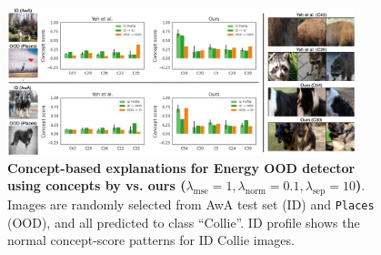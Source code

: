 \begin{figure}[t]
\centering
\includegraphics[width=0.9\textwidth]{figures/energy-collie.jpg}
\caption{\small \textbf{Concept-based explanations for Energy OOD detector using concepts by \citet{yeh2020completeness} vs. ours ($\lambda_\textrm{mse} = 1, \lambda_\textrm{norm} = 0.1, \lambda_\textrm{sep} = 10$)}. Images are randomly selected from AwA test set (ID) and \texttt{Places} (OOD), and all predicted to class ``Collie''.
ID profile shows the normal concept-score patterns for ID Collie images.
}
\label{fig:expl-energy-collie}
\vspace{-3mm}
\end{figure}

